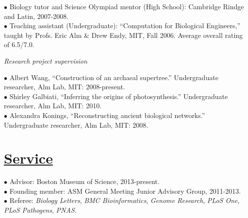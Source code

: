 \documentclass[overlapped,line,11pt]{res}
\begin{document}
\begin{resume}
\vspace{-10mm}
\hangindent=0.5in $\bullet$\hspace{.1in} Biology tutor and Science
Olympiad mentor (High School): Cambridge Rindge and Latin,
2007-2008. \\

\vspace{-10mm}
\hangindent=0.5in $\bullet$\hspace{.1in} Teaching assistant
(Undergraduate): ``Computation for Biological Engineers,''
taught by Profs. Eric Alm \& Drew Endy, MIT, Fall 2006.  Average overall rating
  of 6.5/7.0.

\emph{Research project supervision}

\hangindent=0.5in $\bullet$\hspace{.1in} Albert Wang, ``Construction
of an archaeal supertree.''  Undergraduate researcher, Alm Lab, MIT:
2008-present.\\

\vspace{-10mm} \hangindent=0.5in $\bullet$\hspace{.1in} Shirley
Galbiati, ``Inferring the origins of photosynthesis.''
Undergraduate researcher, Alm Lab, MIT: 2010.\\

\vspace{-10mm} 
\hangindent=0.5in $\bullet$\hspace{.1in} Alexandra
Konings, ``Reconstructing ancient
biological networks.''  Undergraduate researcher, Alm Lab, MIT: 2008.

\section{\underline{\sc Service}}
\vspace{.25in}

\hangindent=0.5in $\bullet$\hspace{.1in} Advisor: Boston Museum of Science, 2013-present. \\

\vspace{-10mm}
\hangindent=0.5in $\bullet$\hspace{.1in} Founding member: ASM General Meeting
Junior Advisory Group, 2011-2013. \\

\vspace{-10mm} \hangindent=0.5in $\bullet$\hspace{.1in} Referee:
\emph{Biology Letters}, \emph{BMC Bioinformatics}, \emph{Genome
  Research}, \emph{PLoS One}, \emph{PLoS Pathogens}, \emph{PNAS}.



\end{resume}
\end{document}
